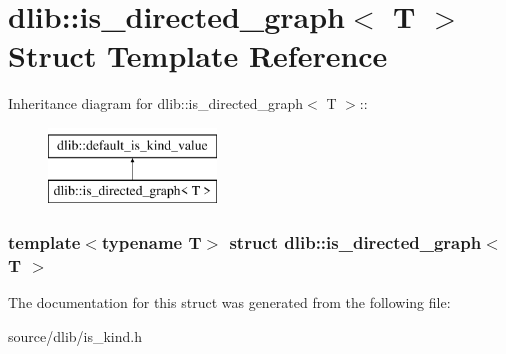 \hypertarget{structdlib_1_1is__directed__graph}{
\section{dlib::is\_\-directed\_\-graph$<$ T $>$ Struct Template Reference}
\label{structdlib_1_1is__directed__graph}
}
Inheritance diagram for dlib::is\_\-directed\_\-graph$<$ T $>$::\begin{figure}[H]
\begin{center}
\leavevmode
\includegraphics[height=2cm]{structdlib_1_1is__directed__graph}
\end{center}
\end{figure}
\subsubsection*{template$<$typename T$>$ struct dlib::is\_\-directed\_\-graph$<$ T $>$}



The documentation for this struct was generated from the following file:\begin{DoxyCompactItemize}
\item 
source/dlib/is\_\-kind.h\end{DoxyCompactItemize}
